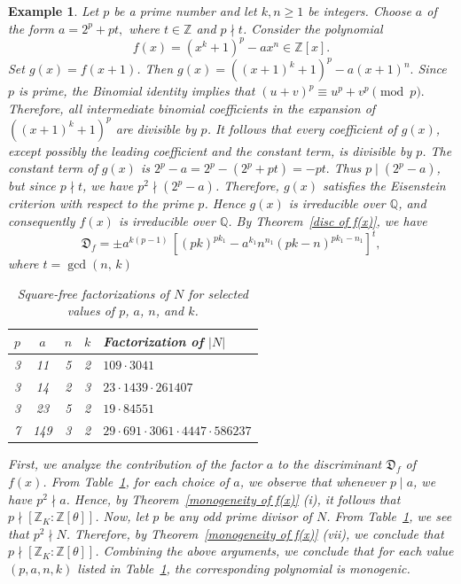 \documentclass[table]{amsart}
\newtheorem{example}[theorem]{Example}
\newcommand{\D}{\mathfrak{D}}
\numberwithin{equation}{section}
\begin{document}
\begin{example}
Let $p$ be a prime number and let $k,n \ge 1$ be integers. 
Choose $a$ of the form $a = 2^p + pt,$ where $t \in \mathbb{Z}$ and $p \nmid t$. Consider the polynomial  \[f(x) = (x^k+1)^p - a x^n \in \mathbb{Z}[x].\] Set $g(x)=f(x+1)$. Then $g(x)=((x+1)^k+1)^p - a(x+1)^n.$
Since $p$ is prime, the Binomial identity implies that $(u+v)^p \equiv u^p+v^p \pmod p.$ Therefore, all intermediate binomial coefficients in the expansion of  $((x+1)^k+1)^p$ are divisible by $p$. It follows that every coefficient of  $g(x)$, except possibly the leading coefficient and the constant term,  is divisible by $p$. The constant term of $g(x)$ is $2^p - a = 2^p - (2^p+pt) = -pt.$ Thus $p \mid (2^p-a)$, but since $p \nmid t$, we have  $p^2 \nmid (2^p-a)$. Therefore, $g(x)$ satisfies the Eisenstein criterion with respect to the prime $p$. Hence $g(x)$ is irreducible over $\mathbb{Q}$, and consequently $f(x)$ is irreducible over $\mathbb{Q}$. By Theorem~\ref{disc of f(x)}, we  have \[\D_f=\pm a^{k(p-1)}\,[(pk)^{pk_1}-a^{k_1}n^{n_1}(pk-n)^{pk_1-n_1}]^t,\] where $t=\gcd(n,\,k)$
\medskip
\begin{table}[H]
\centering
\begin{tabular}{|c|c|c|c|l|}
\hline
$p$ & $a$ & $n$ & $k$ & Factorization of $|N|$ \\
\hline
3 & 11  & 5 & 2 & $109 \cdot 3041$ \\
3 & 14  & 2 & 3 & $23 \cdot 1439 \cdot 261407$ \\
3 & 23  & 5 & 2 & $19 \cdot 84551$ \\
7 & 149 & 3 & 2 & $29 \cdot 691 \cdot 3061 \cdot 4447 \cdot 586237$ \\
\hline
\end{tabular}
\caption{Square-free factorizations of $N$ for selected values of $p$, $a$, $n$, and $k$.}
\label{tab:squarefreeN}
\end{table}
\medskip

First, we analyze the contribution of the factor $a$ to the discriminant  $\D_f$ of $f(x)$. From Table~\ref{tab:squarefreeN}, for each choice of $a$, we observe that whenever $p \mid a$, we have $p^2 \nmid a$. Hence, by Theorem~\ref{monogeneity of f(x)} (i), it follows that $p \nmid [\mathbb{Z}_K : \mathbb{Z}[\theta]]$. Now, let $p$ be any odd prime divisor of $N$. From  Table~\ref{tab:squarefreeN}, we see that  $p^2 \nmid N$. Therefore, by Theorem~\ref{monogeneity of f(x)} (vii), we conclude that $p \nmid [\mathbb{Z}_K : \mathbb{Z}[\theta]]$.
Combining the above arguments, we conclude that for each value $(p,a,n,k)$ listed in  Table~\ref{tab:squarefreeN}, the corresponding polynomial is monogenic.
\end{example}
\end{document}
